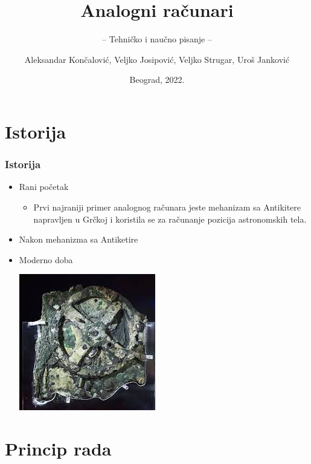 \documentclass[14pt]{beamer}
\title{Analogni računari}
\subtitle{-- Tehničko i naučno pisanje --}
\author{Aleksandar Končalović, Veljko Josipović, Veljko Strugar, Uroš Janković}
\institute{Matematički fakultet\\Univerzitet u Beogradu}
\date{
	\footnotesize{Beograd, 2022.}	
}
\begin{document}
\begin{frame}
	\thispagestyle{empty}
	\titlepage
\end{frame}

\addtocounter{framenumber}{-1}

\section{Istorija}
\begin{frame}[fragile]\frametitle{Istorija}
	\begin{itemize}
		\item Rani početak
		\begin{itemize}
			\item Prvi najraniji primer analognog računara jeste mehanizam sa Antikitere napravljen u Grčkoj i koristila se za računanje pozicija astronomskih tela.
		\end{itemize}
	\end{itemize}
\begin{itemize}
	\item Nakon mehanizma sa Antiketire
    \item Moderno doba
	\begin{itemize}
	\end{itemize}
 \begin{center}
\includegraphics[scale=0.6]{MehanizamSaAntiketere.jpg}
\end{center}
\end{itemize}
\end{frame}

\section{Princip rada}
\end{document}
